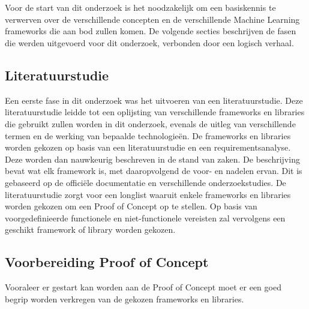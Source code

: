 
\chapter{}%
\label{ch:methodologie}


Voor de start van dit onderzoek is het noodzakelijk om een basiskennis te verwerven over de verschillende concepten en de verschillende Machine Learning frameworks die aan bod zullen komen. De volgende secties beschrijven de fasen die werden uitgevoerd voor dit onderzoek, verbonden door een logisch verhaal.
\section{Literatuurstudie}
Een eerste fase in dit onderzoek was het uitvoeren van een literatuurstudie. Deze literatuurstudie leidde tot een oplijsting van verschillende frameworks en libraries die gebruikt zullen worden in dit onderzoek, evenals de uitleg van verschillende termen en de werking van bepaalde technologieën. De frameworks en libraries worden gekozen op basis van een literatuurstudie en een requirementsanalyse. Deze worden dan nauwkeurig beschreven in de stand van zaken. De beschrijving bevat wat elk framework is, met daaropvolgend de voor- en nadelen ervan. Dit is gebaseerd op de officiële documentatie en verschillende onderzoekstudies.
De literatuurstudie zorgt voor een longlist waaruit enkele frameworks en libraries worden gekozen om een Proof of Concept op te stellen. Op basis van voorgedefinieerde functionele en niet-functionele vereisten zal vervolgens een geschikt framework of library worden gekozen.
\section{Voorbereiding Proof of Concept}
Vooraleer er gestart kan worden aan de Proof of Concept moet er een goed begrip worden verkregen van de gekozen frameworks en libraries.
